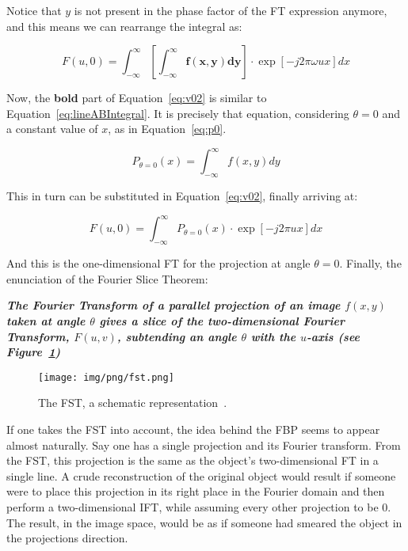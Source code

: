 Notice that $y$ is not present in the phase factor of the \gls{FT}
expression anymore, and this means we can rearrange the integral as:

\begin{equation}
    \label{eq:v02}
    F(u, 0) = \int_{-\infty}^{\infty} \left[ \mathbf{\int_{-\infty}^{\infty}
    f(x, y) dy }\right] \cdot \exp \left[  -j 2\pi  \omega ux \right] dx 
\end{equation}

Now, the \textbf{bold} part of Equation~\ref{eq:v02} is similar to
Equation~\ref{eq:lineABIntegral}. It is precisely that equation,
considering $\theta=0$ and a constant value of $x$, as in
Equation~\ref{eq:p0}.

\begin{equation}
    \label{eq:p0}
    P_{\theta=0} (x) = \int_{-\infty}^{\infty} f(x, y) dy
\end{equation}

This in turn can be substituted in Equation~\ref{eq:v02}, finally
arriving at:

\begin{equation}
    \label{eq:FTP}
    F(u, 0) = \int_{-\infty}^{\infty} P_{\theta=0} (x) \cdot \exp \left[
    -j 2\pi ux \right] dx
\end{equation}

And this is the one-dimensional \gls{FT} for the projection at angle
$\theta=0$. Finally, the enunciation of the Fourier Slice Theorem:
\begin{center}
    \begin{minipage}{0.8\textwidth}

        \noindent\textbf{\emph{The Fourier Transform of a parallel
                projection  of an image $f(x, y)$ taken at angle
                $\theta$ gives a slice of the two-dimensional Fourier
                Transform, $F(u, v)$, subtending an angle $\theta$ with
                the $u$-axis (see Figure~\ref{fig:fst})}}

    \end{minipage}
\end{center}

\begin{figure}[htpb]
    \centering
    \texttt{[image: img/png/fst.png]}
    \caption{The \gls{FST}, a schematic
    representation~\cite{Asl2013a}.}
    \label{fig:fst}
\end{figure}

If one takes the \gls{FST} into account, the idea behind the \gls{FBP}
seems to appear almost naturally. Say one has a single projection and
its Fourier transform. From the \gls{FST}, this projection is the same
as the object's two-dimensional \gls{FT} in a single line. A crude
reconstruction of the original object would result if someone were to
place this projection in its right place in the Fourier domain and then
perform a two-dimensional \gls{IFT}, while assuming every other
projection to be 0. The result, in the image space, would be as if
someone had smeared the object in the projections direction.

